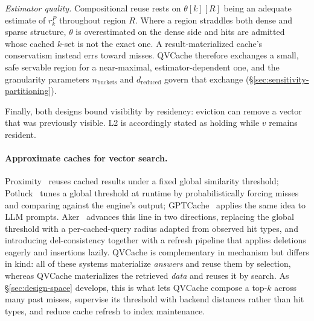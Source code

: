 \emph{Estimator quality.} Compositional reuse rests on $\theta[k][R]$
being an adequate estimate of $r^P_k$ throughout region $R$. Where a
region straddles both dense and sparse structure, $\theta$ is
overestimated on the dense side and hits are admitted whose cached
$k$-set is not the exact one. A result-materialized cache's
conservatism instead errs toward misses. QVCache therefore exchanges a
small, safe servable region for a near-maximal, estimator-dependent
one, and the granularity parameters $n_{\text{buckets}}$ and
$d_{\text{reduced}}$ govern that exchange
(\S\ref{sec:sensitivity-partitioning}).

Finally, both designs bound visibility by residency: eviction can
remove a vector that was previously visible. L2 is accordingly stated
as holding while $v$ remains resident.


\paragraph{Approximate caches for vector search.}
Proximity~\cite{proximity} reuses cached results under a fixed global
similarity threshold; Potluck~\cite{potluck} tunes a global threshold at
runtime by probabilistically forcing misses and comparing against the
engine's output; GPTCache~\cite{gptcache} applies the same idea to LLM
prompts. Aker~\cite{aker} advances this line in two directions,
replacing the global threshold with a per-cached-query radius adapted
from observed hit types, and introducing del-consistency together with a
refresh pipeline that applies deletions eagerly and insertions lazily.
QVCache is complementary in mechanism but differs in kind: all of these
systems materialize \emph{answers} and reuse them by selection, whereas
QVCache materializes the retrieved \emph{data} and reuses it by search.
As \S\ref{sec:design-space} develops, this is what lets QVCache compose
a top-$k$ across many past misses, supervise its threshold with backend
distances rather than hit types, and reduce cache refresh to index
maintenance.

